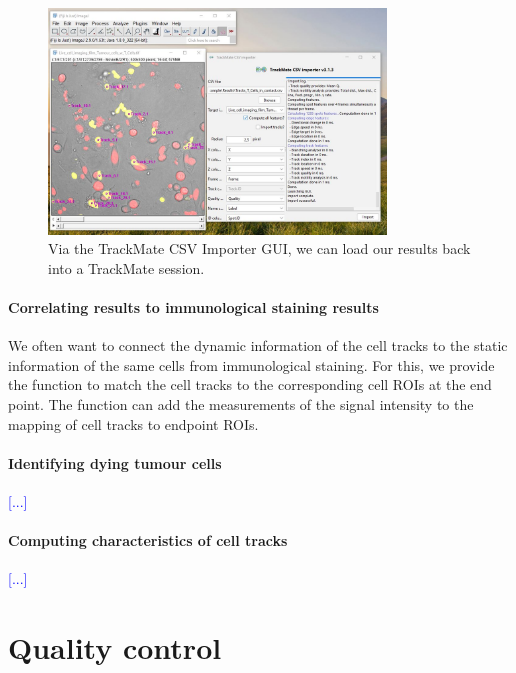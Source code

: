 \documentclass{report}
\begin{document}
\begin{figure}[h!]
\centering
\includegraphics[width=0.8\textwidth]{Screenshot_TrackMate_CSV_Importer.JPG}
\caption[TrackMate_CSV_Importer]{Via the TrackMate CSV Importer GUI, we can load our results back into a TrackMate session. \label{TrackMate_CSV_Importer}}
\end{figure}

\paragraph{Correlating results to immunological staining results}
We often want to connect the dynamic information of the cell tracks to the static information of the same cells from immunological staining. For this, we provide the function  to match the cell tracks to the corresponding cell ROIs at the end point. The function  can add the measurements of the signal intensity to the mapping of cell tracks to endpoint ROIs.

\paragraph{Identifying dying tumour cells}
\textcolor{blue}{[...]}

\paragraph{Computing characteristics of cell tracks}
\textcolor{blue}{[...]}

\section{Quality control}
\end{document}
